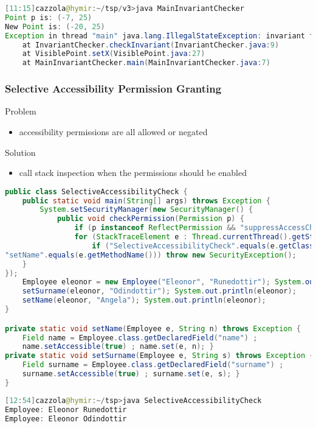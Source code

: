 \begin{lstlisting}[language=Java]
[11:15]cazzola@hymir:~/tsp/v3>java MainInvariantChecker
Point p is: (-7, 25)
New Point is: (-20, 25)
Exception in thread "main" java.lang.IllegalStateException: invariant failure
	at InvariantChecker.checkInvariant(InvariantChecker.java:9)
	at VisiblePoint.setX(VisiblePoint.java:27)
	at MainInvariantChecker.main(MainInvariantChecker.java:7)
\end{lstlisting}

\subsubsection{Selective Accessibility Permission Granting}

Problem
\begin{itemize}
	\item accessibility permissions are all allowed or negated
\end{itemize}

Solution
\begin{itemize}
	\item call stack inspection when the permissions should be enabled
\end{itemize}

\begin{lstlisting}[language=Java]
public class SelectiveAccessibilityCheck {
	public static void main(String[] args) throws Exception {
		System.setSecurityManager(new SecurityManager() {
			public void checkPermission(Permission p) {
				if (p instanceof ReflectPermission && "suppressAccessChecks".equals(p.getName()))
				for (StackTraceElement e : Thread.currentThread().getStackTrace())
					if ("SelectiveAccessibilityCheck".equals(e.getClassName()) &&
"setName".equals(e.getMethodName())) throw new SecurityException();
	}
});
	Employee eleonor = new Employee("Eleonor", "Runedottir"); System.out.println(eleonor);
	setSurname(eleonor, "Odindottir"); System.out.println(eleonor);
	setName(eleonor, "Angela"); System.out.println(eleonor);
}

private static void setName(Employee e, String n) throws Exception {
	Field name = Employee.class.getDeclaredField("name") ;
	name.setAccessible(true) ; name.set(e, n); }
private static void setSurname(Employee e, String s) throws Exception {
	Field surname = Employee.class.getDeclaredField("surname") ;
	surname.setAccessible(true) ; surname.set(e, s); }
}
\end{lstlisting}

\begin{lstlisting}[language=Java]
[12:54]cazzola@hymir:~/tsp>java SelectiveAccessibilityCheck
Employee: Eleonor Runedottir
Employee: Eleonor Odindottir
\end{lstlisting}